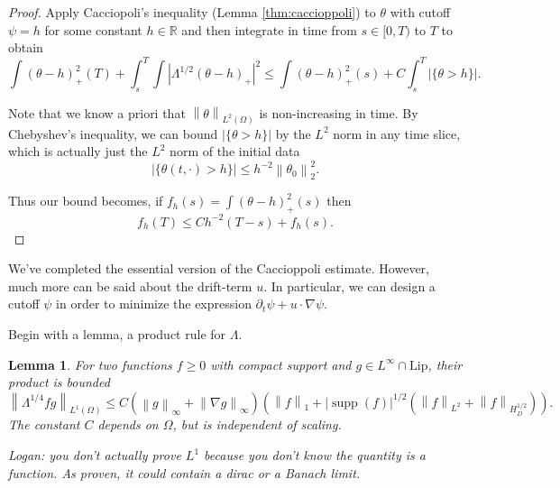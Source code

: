 \documentclass[11pt]{amsart}
\newtheorem{lemma}[theorem]{Lemma}
\theoremstyle{remark}
\theoremstyle{definition}
\newcommand{\R}{\mathbb{R}}
\newcommand{\norm}[1]{\left\lVert#1\right\rVert}
\newcommand{\paren}[1]{\left( #1 \right)}
\newcommand{\abs}[1]{\left\lvert #1 \right\rvert}
\DeclareMathOperator{\supp}{supp}
\newcommand{\del}{\partial}
\newcommand{\grad}{\nabla}
\newcommand{\Lip}{\text{Lip}}
\newcommand{\HD}[2]{\int \abs{\Lambda^{#1} #2}^2}
\newcommand{\HDh}[1]{\HD{1/2}{#1}}
\begin{document}
\begin{proof}
Apply Cacciopoli's inequality (Lemma \ref{thm:caccioppoli}) to $\theta$ with cutoff $\psi = h$ for some constant $h \in \R$ and then integrate in time from $s \in [0,T)$ to $T$ to obtain
\[ \int (\theta-h)_+^2(T) + \int_s^T \HDh{(\theta-h)_+} \leq \int (\theta-h)_+^2(s) + C \int_s^T |\{\theta > h\}|. \]

Note that we know a priori that $\norm{\theta}_{L^2(\Omega)}$ is non-increasing in time.  By Chebyshev's inequality, we can bound $|\{\theta > h\}|$ by the $L^2$ norm in any time slice, which is actually just the $L^2$ norm of the initial data
\[ |\{\theta(t,\cdot) > h\}| \leq h^{-2} \norm{\theta_0}_2^2. \]

Thus our bound becomes, if $f_h(s) = \int (\theta-h)_+^2(s)$ then
\[ f_h(T) \leq C h^{-2} (T-s) + f_h(s). \]
\end{proof}

We've completed the essential version of the Caccioppoli estimate.  However, much more can be said about the drift-term $u$.  In particular, we can design a cutoff $\psi$ in order to minimize the expression $\del_t \psi + u\cdot\grad\psi$.  

Begin with a lemma, a product rule for $\Lambda$.  

\begin{lemma} \label{thm:weak product rule}
For two functions $f \geq 0$ with compact support and $g \in L^\infty \cap \Lip$, their product is bounded
\[ \norm{\Lambda^{1/4} fg}_{L^1(\Omega)} \leq C \paren{\norm{g}_\infty + \norm{\grad g}_\infty} \paren{\norm{f}_1 + |\supp(f)|^{1/2} \paren{ \norm{f}_{L^2} + \norm{f}_{H_D^{1/2}}}}. \]
The constant $C$ depends on $\Omega$, but is independent of scaling.  

Logan: you don't actually prove $L^1$ because you don't know the quantity is a function.  As proven, it could contain a dirac or a Banach limit. 
\end{lemma}
\end{document}
